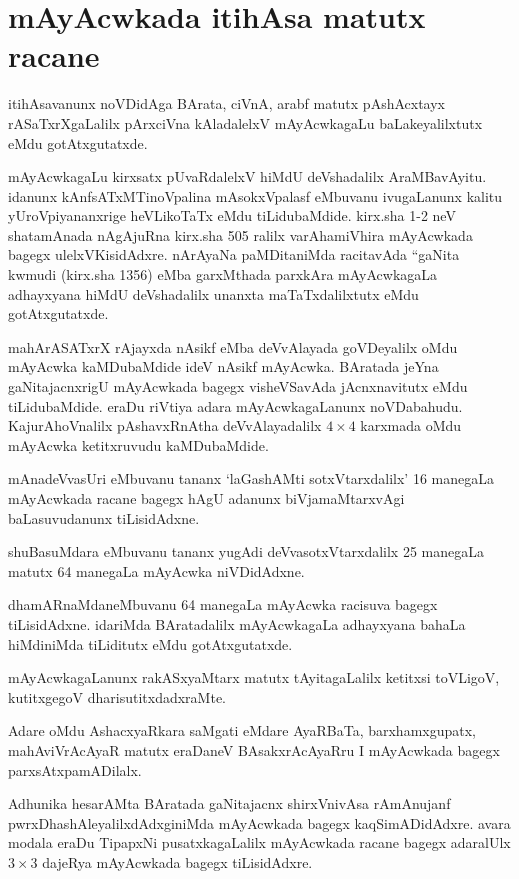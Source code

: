 \chapter{mAyAcwkada itihAsa matutx racane}

itihAsavanunx noVDidAga BArata, ciVnA, arabf matutx pAshAcxtayx rASaTxrXgaLalilx pArxciVna kAladalelxV mAyAcwkagaLu baLakeyalilxtutx eMdu gotAtxgutatxde.

mAyAcwkagaLu kirxsatx pUvaRdalelxV hiMdU deVshadalilx AraMBavAyitu. idanunx kAnfsATxMTinoVpalina mAsokxVpalasf eMbuvanu ivugaLanunx kalitu yUroVpiyananxrige heVLikoTaTx eMdu tiLidubaMdide. kirx.sha {\rm 1-2} neV shatamAnada nAgAjuRna kirx.sha {\rm 505} ralilx varAhamiVhira mAyAcwkada bagegx ulelxVKisidAdxre. nArAyaNa paMDitaniMda racitavAda ``gaNita kwmudi (kirx.sha {\rm 1356}) eMba garxMthada parxkAra mAyAcwkagaLa adhayxyana hiMdU deVshadalilx unanxta maTaTxdalilxtutx eMdu gotAtxgutatxde.

mahArASATxrX rAjayxda nAsikf eMba deVvAlayada goVDeyalilx oMdu mAyAcwka kaMDubaMdide ideV nAsikf mAyAcwka. BAratada jeYna gaNitajacnxrigU mAyAcwkada bagegx visheVSavAda jAcnxnavitutx eMdu tiLidubaMdide. eraDu riVtiya adara mAyAcwkagaLanunx noVDabahudu. KajurAhoVnalilx pAshavxRnAtha deVvAlayadalilx $4\times 4$ karxmada oMdu mAyAcwka ketitxruvudu kaMDubaMdide.

mAnadeVvasUri eMbuvanu tananx `laGashAMti sotxVtarxdalilx' {\rm 16} manegaLa mAyAcwkada racane bagegx hAgU adanunx biVjamaMtarxvAgi baLasuvudanunx tiLisidAdxne.

shuBasuMdara eMbuvanu tananx yugAdi deVvasotxVtarxdalilx {\rm 25} manegaLa matutx {\rm 64} manegaLa mAyAcwka niVDidAdxne.

dhamARnaMdaneMbuvanu {\rm 64} manegaLa mAyAcwka racisuva bagegx tiLisidAdxne. idariMda BAratadalilx mAyAcwkagaLa adhayxyana bahaLa hiMdiniMda tiLiditutx eMdu gotAtxgutatxde.

mAyAcwkagaLanunx rakASxyaMtarx matutx tAyitagaLalilx ketitxsi toVLigoV, kutitxgegoV dharisutitxdadxraMte.

Adare oMdu AshacxyaRkara saMgati eMdare AyaRBaTa, barxhamxgupatx, mahAviVrAcAyaR matutx eraDaneV BAsakxrAcAyaRru I mAyAcwkada bagegx parxsAtxpamADilalx.

Adhunika hesarAMta BAratada gaNitajacnx shirxVnivAsa rAmAnujanf pwrxDhashAleyalilxdAdxginiMda mAyAcwkada bagegx kaqSimADidAdxre. avara modala eraDu TipapxNi pusatxka\-gaLalilx mAyAcwkada racane bagegx adaralUlx $3\times 3$ dajeRya mAyAcwkada bagegx tiLisidAdxre.

